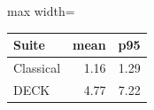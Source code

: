 \begin{adjustbox}{max width=\linewidth}
\begin{tabular}{lrr}
\toprule
Suite & mean & p95 \\
\midrule
Classical & 1.16 & 1.29 \\
DECK & 4.77 & 7.22 \\
\bottomrule
\end{tabular}
\end{adjustbox}
\par{}
